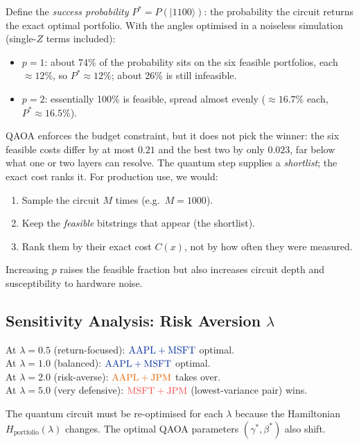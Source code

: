 \documentclass[a4paper,11pt]{article}
\newcommand{\crd}[1]{\textcolor{ibmred}{#1}}
\newcommand{\cblu}[1]{\textcolor{ibmblue}{#1}}
\newcommand{\corg}[1]{\textcolor{orangecolor}{#1}}
\newcommand{\ket}[1]{|#1\rangle}
\begin{document}
Define the \emph{success probability} $P^* = P(\ket{1100})$: the
probability the circuit returns the exact optimal portfolio. With the angles
optimised in a noiseless simulation (single-$Z$ terms included):
\begin{itemize}
    \item $p=1$: about 74\% of the probability sits on the six feasible
          portfolios, each $\approx 12\%$, so $P^* \approx 12\%$; about 26\%
          is still infeasible.
    \item $p=2$: essentially 100\% is feasible, spread almost evenly
          ($\approx 16.7\%$ each, $P^* \approx 16.5\%$).
\end{itemize}
QAOA enforces the budget constraint, but it does not pick the winner: the six
feasible costs differ by at most $0.21$ and the best two by only $0.023$, far
below what one or two layers can resolve. The quantum step supplies a
\emph{shortlist}; the exact cost ranks it. For production use, we would:

\begin{enumerate}
    \item Sample the circuit $M$ times (e.g.\ $M=1000$).
    \item Keep the \emph{feasible} bitstrings that appear (the shortlist).
    \item Rank them by their exact cost $C(x)$, not by how often they were
          measured.
\end{enumerate}

Increasing $p$ raises the feasible fraction but also increases circuit
depth and susceptibility to hardware noise.

\subsection{Sensitivity Analysis: Risk Aversion $\lambda$}

\begin{mathbox}
At $\lambda = 0.5$ (return-focused): $\cblu{\text{AAPL}+\text{MSFT}}$ optimal. \\
At $\lambda = 1.0$ (balanced):      $\cblu{\text{AAPL}+\text{MSFT}}$ optimal. \\
At $\lambda = 2.0$ (risk-averse):   $\corg{\text{AAPL}+\text{JPM}}$ takes over. \\
At $\lambda = 5.0$ (very defensive): $\crd{\text{MSFT}+\text{JPM}}$ (lowest-variance
                                                                    pair) wins.

\noindent The quantum circuit must be re-optimised for each $\lambda$
because the Hamiltonian $H_\text{portfolio}(\lambda)$ changes.
The optimal QAOA parameters $(\gamma^*,\beta^*)$ also shift.
\end{mathbox}
\end{document}
